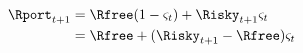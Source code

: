   \begin{equation}\begin{gathered}\begin{aligned}
    \Rport_{t+1}  & = \Rfree(1-\varsigma_{t}) + \Risky_{t+1}\varsigma_{t} \label{eq:return1}
    \\               & = \Rfree + (\Risky_{t+1}-\Rfree) \varsigma_{t} %
  \end{aligned}\end{gathered}\end{equation}
